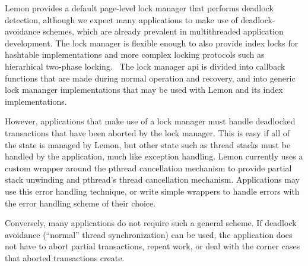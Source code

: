 \documentclass[10pt,letterpaper,twocolumn,english]{article}
\newcommand{\yad}{Lemon\xspace}
\begin{document}
 \yad provides a default page-level lock manager that performs deadlock
detection, although we expect many applications to make use of
deadlock-avoidance schemes, which are already prevalent in
multithreaded application development.  The lock manager is flexible
enough to also provide index locks for hashtable implementations and 
more complex locking protocols such as hierarhical two-phase 
locking.~\cite{hierarcicalLocking,ariesim}  
The lock manager api is divided into callback functions that are made 
during normal operation and recovery, and into generic lock mananger 
implementations that may be used with \yad and its index implementations.



However, applications that
make use of a lock manager must handle deadlocked transactions
that have been aborted by the lock manager.  This is easy if all of
the state is managed by \yad, but other state such as thread stacks
must be handled by the application, much like exception handling.  
\yad currently uses a custom wrapper around the pthread cancellation 
mechanism to provide partial stack unwinding and pthread's thread
cancellation mechanism.  Applications may use this error handling 
technique, or write simple wrappers to handle errors with the 
error handling scheme of their choice.

Conversely, many applications do not require such a general scheme.
If deadlock avoidance (``normal'' thread synchronization) can be used,
the application does not have to abort partial transactions, repeat
work, or deal with the corner cases that aborted transactions create.



\end{document}

